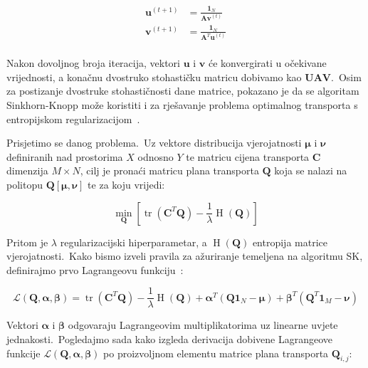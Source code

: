 \documentclass[diplomskirad]{fer}
\begin{document}
\begin{equation}
  \begin{aligned}
    \bm{u}^{(t + 1)} &= \frac{\bm{1}_N}{\bm{A} \bm{v}^{(t)}} \\
    \bm{v}^{(t + 1)} &= \frac{\bm{1}_N}{\bm{A}^T \bm{u}^{(t)}} \\
  \end{aligned}
  \label{eq:sk_basic_form}
\end{equation}

Nakon dovoljnog broja iteracija, vektori $\bm{u}$ i $\bm{v}$ će konvergirati u očekivane vrijednosti, a konačnu dvostruko stohastičku matricu dobivamo kao $\bm{U} \bm{A} \bm{V}$.\ 
Osim za postizanje dvostruke stohastičnosti dane matrice, pokazano je da se algoritam Sinkhorn-Knopp može koristiti i za rješavanje problema optimalnog transporta s entropijskom regularizacijom~\cite{cuturi2013sinkhorn}.\ 

Prisjetimo se danog problema.\ Uz vektore distribucija vjerojatnosti $\bm{\mu}$ i $\bm{\nu}$ definiranih nad prostorima $X$ odnosno $Y$ te matricu cijena transporta $\bm{C}$ dimenzija $M \times N$, cilj je pronaći matricu plana transporta $\bm{Q}$ koja se nalazi na politopu $\bm{Q}\left[ \bm{\mu}, \bm{\nu} \right]$ te za koju vrijedi:

\begin{equation}
  \min_{\bm{Q}} \left[ \operatorname{tr}(\bm{C}^T \bm{Q}) - \frac{1}{\lambda} \operatorname{H}(\bm{Q}) \right]
  \label{eq:ot_with_entropy_repeat}
\end{equation}

Pritom je $\lambda$ regularizacijski hiperparametar, a $\operatorname{H}(\bm{Q})$ entropija matrice vjerojatnosti.\ Kako bismo izveli pravila za ažuriranje temeljena na algoritmu SK, definirajmo prvo Lagrangeovu funkciju~\cite{slater2013lagrange}:

\begin{equation}
  \mathcal{L}(\bm{Q}, \bm{\alpha}, \bm{\beta}) = \operatorname{tr}(\bm{C}^T \bm{Q}) - \frac{1}{\lambda} \operatorname{H}(\bm{Q}) + \bm{\alpha}^T (\bm{Q} \bm{1}_N - \bm{\mu}) + \bm{\beta}^T (\bm{Q}^T \bm{1}_M - \bm{\nu})
  \label{eq:sk_lagrange}
\end{equation}

Vektori $\bm{\alpha}$ i $\bm{\beta}$ odgovaraju Lagrangeovim multiplikatorima uz linearne uvjete jednakosti.\ Pogledajmo sada kako izgleda derivacija dobivene Lagrangeove funkcije $\mathcal{L}(\bm{Q}, \bm{\alpha}, \bm{\beta})$ po proizvoljnom elementu matrice plana transporta $\bm{Q}_{i,j}$:
\end{document}
